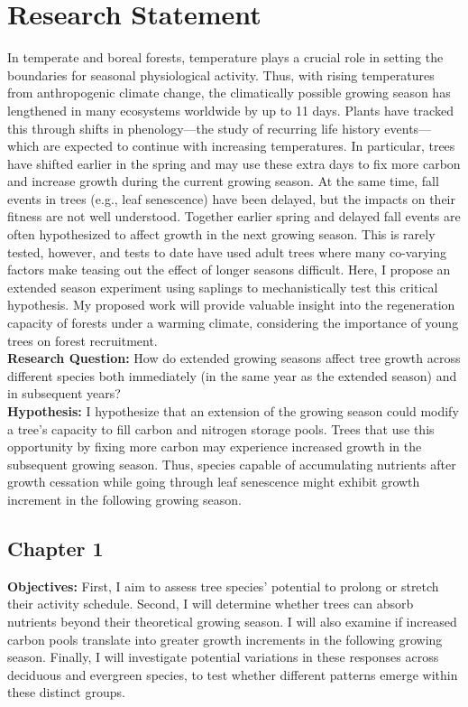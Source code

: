 \documentclass[11pt,letter]{article}
\begin{document}
\section*{Research Statement}
In temperate and boreal forests, temperature plays a crucial role in setting the boundaries for seasonal physiological activity. Thus, with rising temperatures from anthropogenic climate change, the climatically possible growing season has lengthened in many ecosystems worldwide by up to 11 days.\citep{korner_phenology_2010, menzel_growing_1999} Plants have tracked this through shifts in phenology—the study of recurring life history events—which are expected to continue with increasing temperatures.\citep{wolkovich_warming_2012} In particular, trees have shifted earlier in the spring and may use these extra days to fix more carbon and increase growth during the current growing season.\citep{keenan_net_2014, wang_interactive_2020} At the same time, fall events in trees (e.g., leaf senescence) have been delayed, but the impacts on their fitness are not well understood. Together earlier spring and delayed fall events are often hypothesized to affect growth in the next growing season. This is rarely tested, however, and tests to date have used adult trees where many co-varying factors make teasing out the effect of longer seasons difficult. Here, I propose an extended season experiment using saplings to mechanistically test this critical hypothesis. My proposed work will provide valuable insight into the regeneration capacity of forests under a warming climate, considering the importance of young trees on forest recruitment. \citep{zohner_how_2021} \\
\textbf {Research Question:} How do extended growing seasons affect tree growth across different species both immediately (in the same year as the extended season) and in subsequent years? \\
\textbf {Hypothesis:} I hypothesize that an extension of the growing season could modify a tree’s capacity to fill carbon and nitrogen storage pools.\citep{chapin_ecology_1990, lawrence_variable_2018} Trees that use this opportunity by fixing more carbon may experience increased growth in the subsequent growing season.\citep{landhausser_partitioning_2012, martens_first-year_2007} Thus, species capable of accumulating nutrients after growth cessation while going through leaf senescence might exhibit growth increment in the following growing season.\citep{schott_premature_2013} \\
\subsection*{Chapter 1}
\textbf {Objectives:} First, I aim to assess tree species' potential to prolong or stretch their activity schedule. Second, I will determine whether trees can absorb nutrients beyond their theoretical growing season. I will also examine if increased carbon pools translate into greater growth increments in the following growing season. Finally, I will investigate potential variations in these responses across deciduous and evergreen species, to test whether different patterns emerge within these distinct groups.\\
\end{document}
